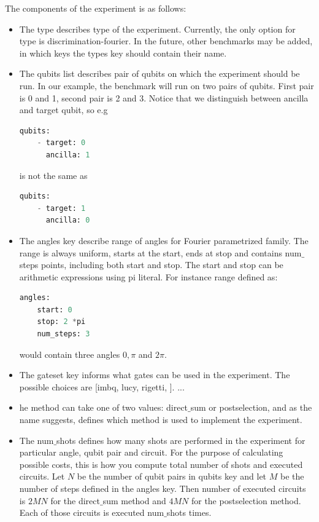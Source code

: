\documentclass[preprint,12pt, a4paper, dvipsnames]{elsarticle}
\newcommand{\1}{{\rm 1\hspace{-0.9mm}l}}
\begin{document}
The components of the experiment is as follows:
\begin{itemize}
	\item The type describes type of the experiment. Currently, the only option for type is discrimination-fourier. In the future, other benchmarks may be added, in which keys the types key should contain their name.
	\item The qubits list describes pair of qubits on which the experiment should be run. In our example, the benchmark will run on two pairs of qubits. First pair is 0 and 1, second pair is 2 and 3.
	Notice that we distinguish between ancilla and target qubit, so e.g
	
	
	\begin{lstlisting}[language=Python]
qubits:
	- target: 0
      ancilla: 1
	\end{lstlisting}
	is not the same as 
	\begin{lstlisting}[language=Python]
qubits:
	- target: 1
      ancilla: 0
	\end{lstlisting}
\item The angles key describe range of angles for Fourier parametrized family. The range is always uniform, starts at the start, ends at stop and contains num$\_$steps points, including both start and stop. The start and stop can be arithmetic expressions using pi literal. For instance range defined as:  
\begin{lstlisting}[language=Python]
angles:
	start: 0
	stop: 2 *pi
	num_steps: 3
\end{lstlisting}
 would contain three angles $0, \pi$  and $2\pi$.
 \item The gateset key informs what gates can be used in the experiment. The possible choices are [imbq, lucy, rigetti, ]. ... 
 \item he method can take one of two values: direct$\_$sum or postselection, and as the name suggests, defines which method is used to implement the experiment.
 \item The num$\_$shots defines how many shots are performed in the experiment for particular angle, qubit pair and circuit. For the purpose of calculating possible costs, this is how you compute total number of shots and executed circuits. Let $N$ be the number of qubit pairs in qubits key and let $M$ be the number of steps defined in the angles key. Then number of executed circuits is $2MN$ for the direct$\_$sum method and $4MN$ for the postselection method. Each of those circuits is executed num$\_$shots times.
\end{itemize}
\end{document}
